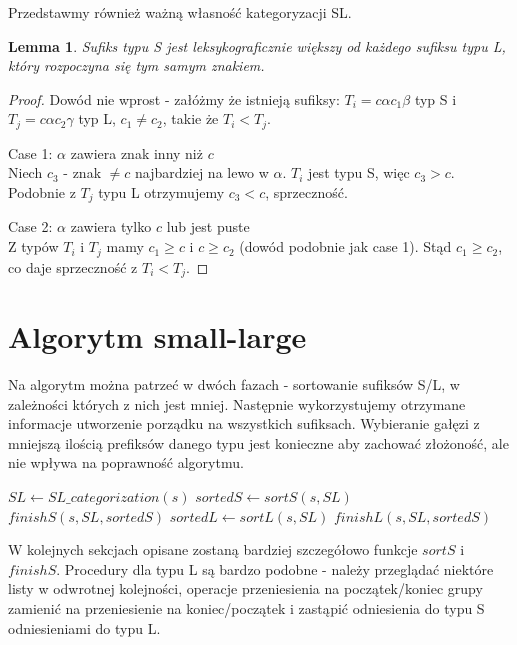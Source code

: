 \documentclass[
12pt
]{article}
\newtheorem{lemma}[theorem]{Lemma}
\theoremstyle{definition}
\theoremstyle{remark}
\begin{document}
Przedstawmy również ważną własność kategoryzacji SL.

\begin{lemma}\label{SL_order}
Sufiks typu S jest leksykograficznie większy od każdego sufiksu typu L, który rozpoczyna się tym samym znakiem.
\end{lemma}
\begin{proof}
Dowód nie wprost - załóżmy że istnieją sufiksy: $T_i = c \alpha c_1 \beta$ typ S i $T_j = c\alpha c_2 \gamma$ typ L, $c_1 \neq c_2$, takie że $T_i < T_j$.

\item[Case 1:] $\alpha$ zawiera znak inny niż $c$\\
Niech $c_3$ - znak $\neq c$ najbardziej na lewo w $\alpha$. $T_i$ jest typu S, więc $c_3>c$. Podobnie z $T_j$ typu L otrzymujemy $c_3<c$, sprzeczność.

\item[Case 2:] $\alpha$ zawiera tylko $c$ lub jest puste\\
Z typów $T_i$ i $T_j$ mamy $c_1 \geq c$ i $c \geq c_2$ (dowód podobnie jak case 1). Stąd $c_1 \geq c_2$, co daje sprzeczność z $T_i < T_j$.

\end{proof}

\section*{Algorytm small-large}

Na algorytm można patrzeć w dwóch fazach - sortowanie sufiksów S/L, w zależności których z nich jest mniej. Następnie wykorzystujemy otrzymane informacje utworzenie porządku na wszystkich sufiksach. Wybieranie gałęzi z mniejszą ilością prefiksów danego typu jest konieczne aby zachować złożoność, ale nie wpływa na poprawność algorytmu.


\begin{algorithmic}
\State $SL \gets SL\_categorization(s)$
	\State $sortedS \gets sortS(s, SL)$
	\State \Return $finishS(s, SL, sortedS)$
\Else
	\State $sortedL \gets sortL(s, SL)$
	\State \Return $finishL(s, SL, sortedS)$
\EndIf
\EndProcedure
\end{algorithmic}

W kolejnych sekcjach opisane zostaną bardziej szczegółowo funkcje $sortS$ i $finishS$. Procedury dla typu L są bardzo podobne - należy przeglądać niektóre listy w odwrotnej kolejności, operacje przeniesienia na początek/koniec grupy zamienić na przeniesienie na koniec/początek i zastąpić odniesienia do typu S odniesieniami do typu L.
\end{document}
